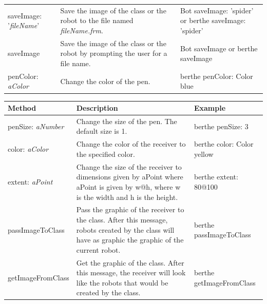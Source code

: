 \documentclass[a4paper,10pt,twoside]{book}
\begin{document}
{\begin{tabular}{p{20mm}p{50mm}p{30mm}}
\textsf{saveImage: '{\itshape fileName}'} & Save the image of the class or the robot to the file named 
\emph{fileName.frm}. & \textsf{Bot saveImage: 'spider'} \newline or \newline  \textsf{berthe saveImage: 'spider'} \\

\textsf{saveImage} & Save the image of the class or the robot by prompting the user for a file name. 
& \textsf{Bot saveImage} or \newline  \textsf{berthe saveImage} \\

\textsf{penColor: {\itshape aColor}} & 
Change the color of the pen.
& \textsf{berthe penColor: Color blue} \\
\hline
\end{tabular}}

\noindent
{\small \begin{tabular}{p{20mm}p{50mm}p{30mm}}
\hline
\textbf{Method} & \textbf{Description} & \textbf{Example}\\
\hline

\textsf{penSize: {\itshape aNumber}} & 
Change the size of the pen. The default size is 1. 
& \textsf{berthe penSize: 3} \\

\textsf{color: {\itshape aColor}} & Change the color of the receiver to the specified color. 
& \textsf{berthe color: Color yellow} \\ 

\textsf{extent: {\itshape aPoint}} & Change the size of the receiver to dimensions given by \textsf{aPoint}
where \textsf{aPoint} is given by \textsf{w@h}, where \textsf{w} is the width and \textsf{h} is the height. & \textsf{berthe extent: 80@100} \\

 \textsf{passImageToClass} & Pass the graphic of the receiver to the class. After this message, robots created by the class will have as graphic the graphic of the current robot. & \textsf{berthe passImageToClass} \\
 
 \textsf{getImageFromClass} & Get the graphic of the class. After this message, the receiver will look like the robots that would be created by the class.  & \textsf{berthe getImageFromClass} \\
\hline
\end{tabular}}
\end{document}
